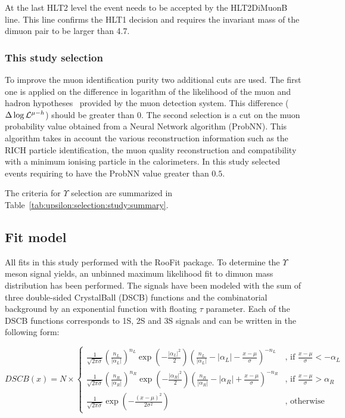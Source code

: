 At the last HLT2 level the event needs to be accepted by the HLT2DiMuonB line.
This line confirms the HLT1 decision and requires the invariant mass of the
dimuon pair to be larger than 4.7\gevcc.

\subsubsection{This study selection}
\label{sec:upsilon:selection:study}

To improve the muon identification purity two additional cuts are used. The
first one is applied on the difference in logarithm of the likelihood of the
muon and hadron hypotheses~\cite{Powell} provided by the muon detection system.
This difference ($\Delta\log\mathcal{L}^{\mu-h}$) should be greater than 0. The
second selection  is a cut on the muon probability value obtained from a Neural
Network algorithm (ProbNN). This algorithm takes in account the various
reconstruction information such as the RICH particle identification, the muon
quality reconstruction and compatibility with a minimum ionising particle in the
calorimeters. In this study selected events requiring to have the ProbNN value
greater than $0.5$.

The criteria for  $\Upsilon$ selection are summarized in
Table~\ref{tab:upsilon:selection:study:summary}.



\subsection{Fit model}
\label{sec:upsilon:fit}
All  fits in this study performed with the RooFit package\cite{roofit}.
To determine the $\Upsilon$ meson signal yields, an unbinned maximum likelihood
fit to dimuon mass distribution has been performed. The signals have been
modeled with the sum of three double-sided CrystalBall (DSCB) functions and the
combinatorial background by an exponential function with floating $\tau$
parameter. Each of the DSCB functions corresponds to \Y1S, \Y2S and \Y3S
signals and can be written in the following form:

\begin{equation}
DSCB(x) = N \times
\begin{cases}
\frac{1}{\sqrt{2\pi\sigma}}{(\frac{n_L}{|\alpha_L|})}^{n_L}\exp(-\frac{|\alpha_L|^2}{2}){(\frac{n_L}{|\alpha_L|}-|\alpha_L|-\frac{x-\mu}{\sigma})}^{-n_L} & \text{, if $\frac{x-\mu}{\sigma} < -\alpha_L$}\\
\frac{1}{\sqrt{2\pi\sigma}}{(\frac{n_R}{|\alpha_R|})}^{n_R}\exp(-\frac{|\alpha_R|^2}{2}){(\frac{n_R}{|\alpha_R|}-|\alpha_R|+\frac{x-\mu}{\sigma})}^{-n_R} & \text{, if $\frac{x-\mu}{\sigma} > \alpha_R$}\\
\frac{1}{\sqrt{2\pi\sigma}}\exp(-\frac{{(x-\mu)}^2}{2\sigma^2}) & \text{, otherwise}
\end{cases}
\label{eq:dcb}
\end{equation}

